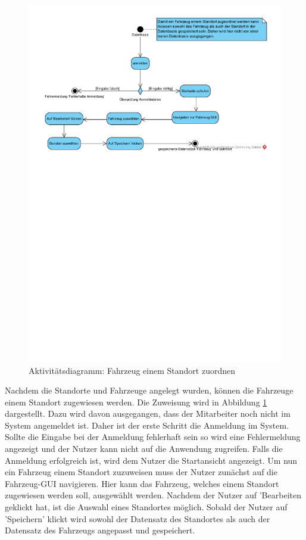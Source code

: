 \begin{figure}[!ht]
    \centering
    \includegraphics[width=\textwidth, trim = 0cm 11cm 0cm 0cm]{Bilder/Diagramme/FahrzeugStandortZuordnen.pdf}
    \caption{Aktivitätsdiagramm: Fahrzeug einem Standort zuordnen}
    \label{img:fahrzeugzuordnen}
\end{figure}

Nachdem die Standorte und Fahrzeuge angelegt wurden, können die Fahrzeuge einem Standort zugewiesen werden. Die Zuweisung wird in Abbildung \ref{img:fahrzeugzuordnen} dargestellt. Dazu wird davon ausgegangen, dass der Mitarbeiter noch nicht im System angemeldet ist. Daher ist der erste Schritt die Anmeldung im System. Sollte die Eingabe bei der Anmeldung fehlerhaft sein so wird eine Fehlermeldung angezeigt und der Nutzer kann nicht auf die Anwendung zugreifen. Falls die Anmeldung erfolgreich ist, wird dem Nutzer die Startansicht angezeigt. Um nun ein Fahrzeug einem Standort zuzuweisen muss der Nutzer zunächst auf die Fahrzeug-GUI navigieren. Hier kann das Fahrzeug, welches einem Standort zugewiesen werden soll, ausgewählt werden. Nachdem der Nutzer auf 'Bearbeiten geklickt hat, ist die Auswahl eines Standortes möglich. Sobald der Nutzer auf 'Speichern' klickt wird sowohl der Datensatz des Standortes als auch der Datensatz des Fahrzeugs angepasst und gespeichert.

